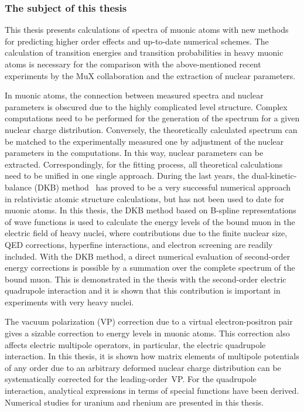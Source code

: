 \subsubsection*{The subject of this thesis}

This thesis presents calculations of spectra of muonic atoms with new methods for predicting higher order effects and up-to-date numerical schemes. 
The calculation of transition energies and transition probabilities in heavy muonic atoms is necessary for the comparison with the above-mentioned recent experiments by the MuX collaboration and the extraction of nuclear parameters.

In muonic atoms, the connection between measured spectra and nuclear parameters is obscured due to the highly complicated level structure. Complex computations need to be performed for the generation of the spectrum for a given nuclear charge distribution. Conversely, the theoretically calculated spectrum can be matched to the experimentally measured one by adjustment of the nuclear parameters in the computations. In this way, nuclear parameters can be extracted. Correspondingly, for the fitting process, all theoretical calculations need to be unified in one single approach. 
During the last years, the dual-kinetic-balance (DKB) method~\cite{Shabaev2004} has proved to be a very successful numerical approach in relativistic atomic structure calculations, but has not been used to date for muonic atoms.
In this thesis, the DKB method based on B-spline representations of wave functions is used to calculate the energy levels of the bound muon in the electric field of heavy nuclei, where contributions due to the finite nuclear size, QED corrections, hyperfine interactions, and electron screening are readily included.
With the DKB method, a direct numerical evaluation of second-order energy corrections is possible by a summation over the complete spectrum of the bound muon. This is demonstrated in the thesis with the second-order electric quadrupole interaction and it is shown that this contribution is important in experiments with very heavy nuclei.

The vacuum polarization (VP) correction due to a virtual electron-positron pair gives a sizable correction to energy levels in muonic atoms. This correction also affects electric multipole operators, in particular, the electric quadrupole interaction. In this thesis, it is shown how matrix elements of multipole potentials of any order due to an arbitrary deformed nuclear charge distribution can be systematically corrected for the leading-order~VP. For the quadrupole interaction, analytical expressions in terms of special functions have been derived.  Numerical studies for uranium and rhenium are presented in this thesis.

